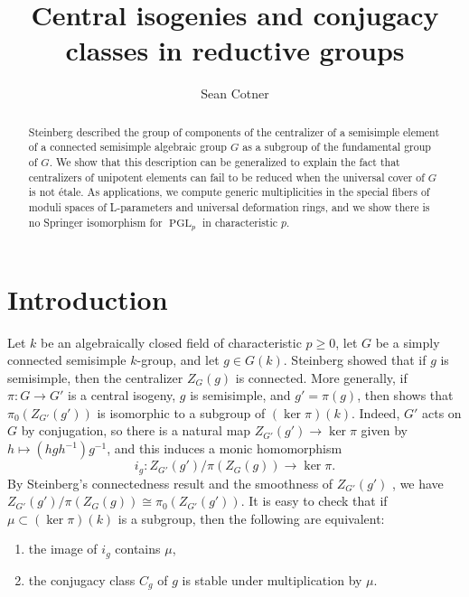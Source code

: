 \documentclass[11pt,reqno]{amsart}
\title{Central isogenies and conjugacy classes in reductive groups}
\author{Sean Cotner}
\theoremstyle{definition}
\DeclareMathOperator{\PGL}{PGL}
\DeclareMathOperator{\Stab}{Stab}
\begin{document}


\begin{abstract}
    Steinberg described the group of components of the centralizer of a semisimple element of a connected semisimple algebraic group $G$ as a subgroup of the fundamental group of $G$. We show that this description can be generalized to explain the fact that centralizers of unipotent elements can fail to be reduced when the universal cover of $G$ is not \'etale. As applications, we compute generic multiplicities in the special fibers of moduli spaces of L-parameters and universal deformation rings, and we show there is no Springer isomorphism for $\PGL_p$ in characteristic $p$.
\end{abstract}

\maketitle

\section{Introduction}

Let $k$ be an algebraically closed field of characteristic $p \geq 0$, let $G$ be a simply connected semisimple $k$-group, and let $g \in G(k)$. Steinberg showed \cite[Theorem 8.1]{SteinbergEndomorphisms} that if $g$ is semisimple, then the centralizer $Z_G(g)$ is connected. More generally, if $\pi\colon G \to G'$ is a central isogeny, $g$ is semisimple, and $g' = \pi(g)$, then \cite[Theorem 9.1(a)]{SteinbergEndomorphisms} shows that $\pi_0(Z_{G'}(g'))$ is isomorphic to a subgroup of $(\ker \pi)(k)$. Indeed, $G'$ acts on $G$ by conjugation, so there is a natural map $Z_{G'}(g') \to \ker \pi$ given by $h \mapsto (hgh^{-1})g^{-1}$, and this induces a monic homomorphism 
\[
i_g\colon Z_{G'}(g')/\pi(Z_G(g)) \to \ker \pi.
\]
By Steinberg's connectedness result and the smoothness of $Z_{G'}(g')$ \cite[Corollary to Theorem 9.2]{Borel}, we have $Z_{G'}(g')/\pi(Z_G(g)) \cong \pi_0(Z_{G'}(g'))$. It is easy to check that if $\mu \subset (\ker \pi)(k)$ is a subgroup, then the following are equivalent:
\begin{enumerate}
    \item the image of $i_g$ contains $\mu$,
    \item the conjugacy class $C_g$ of $g$ is stable under multiplication by $\mu$.
\end{enumerate}
\end{document}
